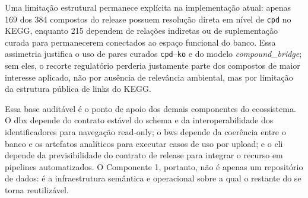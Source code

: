 Uma limitação estrutural permanece explícita na implementação atual: apenas 169 dos 384 compostos do release possuem resolução direta em nível de \texttt{cpd} no KEGG, enquanto 215 dependem de relações indiretas ou de suplementação curada para permanecerem conectados ao espaço funcional do banco. Essa assimetria justifica o uso de pares curados \texttt{cpd}--\texttt{ko} e do modelo \textit{compound\_bridge}; sem eles, o recorte regulatório perderia justamente parte dos compostos de maior interesse aplicado, não por ausência de relevância ambiental, mas por limitação da estrutura pública de links do KEGG.

Essa base auditável é o ponto de apoio dos demais componentes do ecossistema. O \gls{dbx} depende do contrato estável do schema e da interoperabilidade dos identificadores para navegação read-only; o \gls{bws} depende da coerência entre o banco e os artefatos analíticos para executar casos de uso por upload; e o \gls{cli} depende da previsibilidade do contrato de release para integrar o recurso em pipelines automatizados. O Componente 1, portanto, não é apenas um repositório de dados: é a infraestrutura semântica e operacional sobre a qual o restante do \biorempp{} se torna reutilizável.

